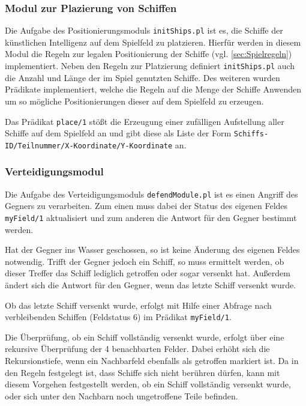 \subsubsection{Modul zur Plazierung von Schiffen} \label{sec:initships}	
	Die Aufgabe des Positionierungsmoduls \texttt{initShips.pl} ist es, die Schiffe der künstlichen Intelligenz auf dem Spielfeld zu platzieren.
	Hierfür werden in diesem Modul die Regeln zur legalen Positionierung der Schiffe (vgl. \ref{sec:Spielregeln}) implementiert. Neben den Regeln 
	zur Platzierung definiert \texttt{initShips.pl} auch die Anzahl und Länge der im Spiel genutzten Schiffe. Des weiteren wurden Prädikate implementiert, 
	welche die Regeln auf die Menge der Schiffe Anwenden um so mögliche Positionierungen dieser auf dem Spielfeld zu erzeugen.
	
	Das Prädikat \texttt{place/1} stößt die Erzeugung einer zufälligen Aufstellung aller Schiffe auf dem Spielfeld an und gibt diese als Liste der Form 
	\newline \texttt{Schiffs-ID/Teilnummer/X-Koordinate/Y-Koordinate} an. 
	
\subsubsection{Verteidigungsmodul} \label{sec:defendModule}
	Die Aufgabe des Verteidigungsmoduls \texttt{defendModule.pl} ist es einen Angriff des Gegners zu verarbeiten.
	Zum einen muss dabei der Status des eigenen Feldes \texttt{myField/1} aktualisiert 
	und zum anderen die Antwort für den Gegner bestimmt werden.
	
	Hat der Gegner ins Wasser geschossen, so ist keine Änderung des eigenen Feldes notwendig. Trifft der Gegner jedoch ein Schiff,
	so muss ermittelt werden, ob dieser Treffer das Schiff lediglich getroffen oder sogar versenkt hat. Außerdem ändert sich die Antwort
	für den Gegner, wenn das letzte Schiff versenkt wurde.
	
	Ob das letzte Schiff versenkt wurde, erfolgt mit Hilfe einer Abfrage nach verbleibenden Schiffen (Feldstatus 6) im Prädikat \texttt{myField/1}.
	
	Die Überprüfung, ob ein Schiff vollständig versenkt wurde, erfolgt über eine rekursive Überprüfung der 4 benachbarten Felder.
	Dabei erhöht sich die Rekursionstiefe, wenn ein Nachbarfeld ebenfalls als getroffen markiert ist. 
	Da in den Regeln festgelegt ist, dass Schiffe sich nicht berühren dürfen, kann mit diesem Vorgehen festgestellt werden, ob ein Schiff
	vollständig versenkt wurde, oder sich unter den Nachbarn noch ungetroffene Teile befinden.
	

